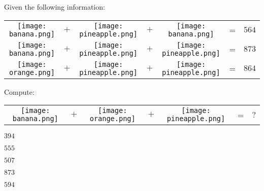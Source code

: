 

\begin{question}
Given the following information:
\begin{center}
\begin{tabular}{ccccccr}
\texttt{[image: banana.png]} & $+$ & \texttt{[image: pineapple.png]} & $+$ & \texttt{[image: banana.png]} & = & $564$ \\
\texttt{[image: banana.png]} & $+$ & \texttt{[image: pineapple.png]} & $+$ & \texttt{[image: pineapple.png]} & = & $873$ \\
\texttt{[image: orange.png]} & $+$ & \texttt{[image: pineapple.png]} & $+$ & \texttt{[image: pineapple.png]} & = & $864$
\end{tabular}
\end{center}

Compute:
\begin{center}
\begin{tabular}{ccccccr}
\texttt{[image: banana.png]} & $+$ & \texttt{[image: orange.png]} & $+$ & \texttt{[image: pineapple.png]} & = & $\text{?}$
\end{tabular}
\end{center}

\begin{answerlist}
  \item $394$
  \item $555$
  \item $507$
  \item $873$
  \item $594$
\end{answerlist}\end{question}

